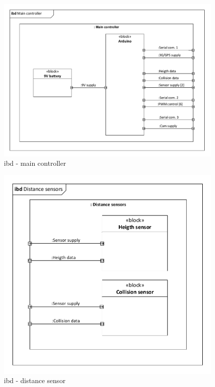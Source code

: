 \begin{figure}[H]
\centering
\includegraphics[width=1\textwidth]{Billeder/IBD/ibd3_maincontroller.pdf}
\caption{ibd - main controller}
\label{fig:ibd_maincontroller}
\end{figure}

\begin{figure}[H]
\centering
\includegraphics[width=1\textwidth]{Billeder/IBD/ibd4_distancesensor.pdf}
\caption{ibd - distance sensor}
\label{fig:ibd_distancesensor}
\end{figure}

